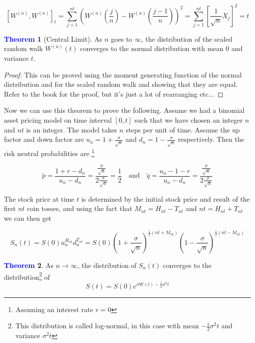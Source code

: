 \documentclass[11pt]{article}
\theoremstyle{definition}
\theoremstyle{definition}
\newtheorem{theorem}{\textcolor{blue}{Theorem}}
\theoremstyle{definition}
\theoremstyle{remark}
\begin{document}
\[
    [W^{(n)}, W^{(n)}]_t = \sum_{j = 1}^{nt} \left(W^{(n)}\left(\frac{j}{n}\right) - W^{(n)}\left(\frac{j - 1}{n}\right)\right)^2 = 
    \sum_{j = 1}^{nt} \left[ \frac{1}{\sqrt{n}} X_j \right]^2 = t
\] 

\begin{theorem}[Central Limit]
    As $n$ goes to $\infty$, the distribution of the scaled random walk $W^{(n)}(t)$ converges to the normal distribution with 
    mean $0$ and variance $t$.
\end{theorem}
\begin{proof}
    This can be proved using the moment generating function of the normal distribution and for the scaled random walk
    and showing that they are equal. Refer to the book for the proof, but it's just a lot of rearranging etc...
\end{proof}

Now we can use this theorem to prove the following. Assume we had a binomial asset pricing model on time
interval $[0, t]$ such that we have chosen an integer $n$ and $nt$ is an integer. The model takes $n$ steps
per unit of time. Assume the up factor and down factor are $u_n = 1 + \frac{\sigma}{\sqrt{n}}$ and 
$d_n = 1 - \frac{\sigma}{\sqrt{n}}$ respectively. Then the risk neutral probabilities are \footnote{Assuming an interest rate $r = 0$}

\[
    \tilde{p} = \frac{1 + r - d_n}{u_n - d_n} = \frac{\frac{\sigma}{\sqrt{n}}}{2\frac{\sigma}{\sqrt{n}}} = \frac{1}{2} \quad \text{and} \quad
    \tilde{q} = \frac{u_n - 1 - r}{u_n - d_n} = \frac{\frac{\sigma}{\sqrt{n}}}{2\frac{\sigma}{\sqrt{n}}}
\] 

The stock price at time $t$ is determined by the initial stock price and result of the first $nt$ coin tosses, and
using the fact that $M_{nt} = H_{nt} - T_{nt}$ and $nt = H_{nt} + T_{nt}$ we can then get

\[
    S_n(t) = S(0) u_n^{H_{nt}} d_n^{T_{nt}} = S(0)\left(1 + \frac{\sigma}{\sqrt{n}}\right)^{\frac{1}{2}(nt + M_{nt})} \left(1 - \frac{\sigma}{\sqrt{n}}\right)^{\frac{1}{2}(nt - M_{nt})}
\] 

\begin{theorem}
    As $n \to \infty$, the distribution of $S_n(t)$ converges to the distribution\footnote{This distribution is called log-normal, in this case with mean $-\frac{1}{2} \sigma^2 t$ and variance $\sigma^2t $  } of
    \[
        S(t) = S(0)e^{\sigma W(t) - \frac{1}{2}\sigma^2 t}
    \]
\end{theorem}
\end{document}
